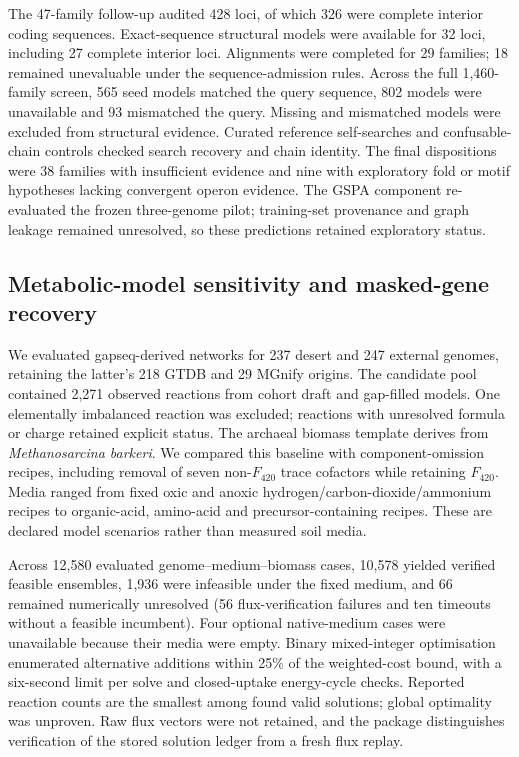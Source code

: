 The 47-family follow-up audited 428 loci, of which 326 were complete interior coding sequences. Exact-sequence structural models were available for 32 loci, including 27 complete interior loci. Alignments were completed for 29 families; 18 remained unevaluable under the sequence-admission rules. Across the full 1,460-family screen, 565 seed models matched the query sequence, 802 models were unavailable and 93 mismatched the query. Missing and mismatched models were excluded from structural evidence. Curated reference self-searches and confusable-chain controls checked search recovery and chain identity. The final dispositions were 38 families with insufficient evidence and nine with exploratory fold or motif hypotheses lacking convergent operon evidence. The GSPA component re-evaluated the frozen three-genome pilot; training-set provenance and graph leakage remained unresolved, so these predictions retained exploratory status.

\subsection*{Metabolic-model sensitivity and masked-gene recovery}

We evaluated gapseq-derived networks for 237 desert and 247 external genomes, retaining the latter's 218 GTDB and 29 MGnify origins. The candidate pool contained 2,271 observed reactions from cohort draft and gap-filled models. One elementally imbalanced reaction was excluded; reactions with unresolved formula or charge retained explicit status. The archaeal biomass template derives from \emph{Methanosarcina barkeri}. We compared this baseline with component-omission recipes, including removal of seven non-$F_{420}$ trace cofactors while retaining $F_{420}$. Media ranged from fixed oxic and anoxic hydrogen/carbon-dioxide/ammonium recipes to organic-acid, amino-acid and precursor-containing recipes. These are declared model scenarios rather than measured soil media.

Across 12,580 evaluated genome--medium--biomass cases, 10,578 yielded verified feasible ensembles, 1,936 were infeasible under the fixed medium, and 66 remained numerically unresolved (56 flux-verification failures and ten timeouts without a feasible incumbent). Four optional native-medium cases were unavailable because their media were empty. Binary mixed-integer optimisation enumerated alternative additions within 25\% of the weighted-cost bound, with a six-second limit per solve and closed-uptake energy-cycle checks. Reported reaction counts are the smallest among found valid solutions; global optimality was unproven. Raw flux vectors were not retained, and the package distinguishes verification of the stored solution ledger from a fresh flux replay.

